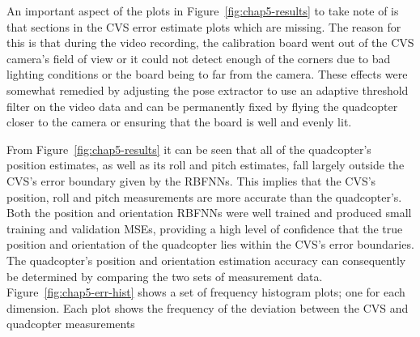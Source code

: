 An important aspect of the plots in Figure~\ref{fig:chap5-results} to take note of is that sections in the CVS error estimate plots which are missing. The reason for this is that during the video recording, the calibration board went out of the CVS camera's field of view or it could not detect enough of the corners due to bad lighting conditions or the board being to far from the camera. These effects were somewhat remedied by adjusting the pose extractor to use an adaptive threshold filter on the video data and can be permanently fixed by flying the quadcopter closer to the camera or ensuring that the board is well and evenly lit. 

From Figure~\ref{fig:chap5-results} it can be seen that all of the quadcopter's position estimates, as well as its roll and pitch estimates, fall largely outside the CVS's error boundary given by the RBFNNs. This implies that the CVS's position, roll and pitch measurements are more accurate than the quadcopter's. Both the position and orientation RBFNNs were well trained and produced small training and validation MSEs, providing a high level of confidence that the true position and orientation of the quadcopter lies within the CVS's error boundaries. The quadcopter's position and orientation estimation accuracy can consequently be determined by comparing the two sets of measurement data. Figure~\ref{fig:chap5-err-hist} shows a set of frequency histogram plots; one for each dimension. Each plot shows the frequency of the deviation between the CVS and quadcopter measurements

